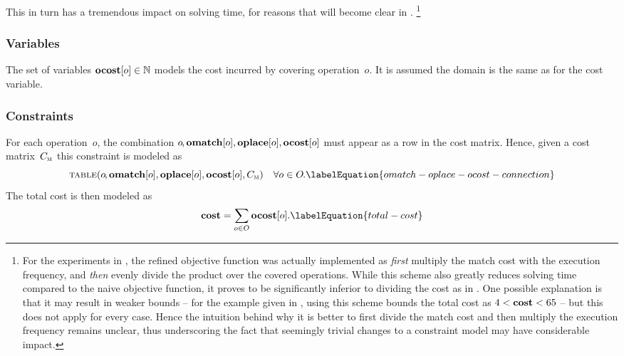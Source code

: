 %
This in turn has a tremendous impact on solving time, for reasons that will
become clear in .\!%
%
\footnote{%
  For the experiments in \cite{HjortBlindellEtAl:2017:CASES}, the refined
  \gls{objective function} was actually implemented as \emph{first} multiply the
  \gls{match} cost with the execution frequency, and \emph{then} evenly divide
  the product over the covered \glspl{operation}.
  While this scheme also greatly reduces solving time compared to the naive
  \gls{objective function}, it proves to be significantly inferior to dividing
  the cost as in .
  One possible explanation is that it may result in weaker bounds -- for the
  example given in , using this scheme bounds the total
  cost as \mbox{$4 < \mVar{cost} < 65$} -- but this does not apply for every
  case.
  Hence the intuition behind why it is better to first divide the \gls{match}
  cost and then multiply the execution frequency remains unclear, thus
  underscoring the fact that seemingly trivial changes to a \gls{constraint
    model} may have considerable impact.%
}


\subsubsection{Variables}

The set of \glspl{variable} \mbox{$\mVar{ocost}[o] \in \mNatNumSet$} models the
cost incurred by covering \gls{operation}~$o$\hspace{-.8pt}.
%
It is assumed the \gls{domain} is the same as for the \gls{cost variable}.


\subsubsection{Constraints}

For each \gls{operation}~$o$\hspace{-.8pt}, the combination
\mbox{$o\hspace{-.8pt}, \mVar{omatch}[o], \mVar{oplace}[o], \mVar{ocost}[o]$}
must appear as a row in the cost matrix.
%
Hence, given a cost matrix~$C_{\textsc{m}}$ this \gls{constraint} is modeled as
%
\begin{equation}
  \mTable(
    o\hspace{-1pt},
    \mVar{omatch}[o],
    \mVar{oplace}[o],
    \mVar{ocost}[o],
    \mCostMatrix
  )
  \mQuantSep
  \forall o \in \mOpSet \hspace{-.8pt}.
  \labelEquation{omatch-oplace-ocost-connection}
\end{equation}
%
The total cost is then modeled as
%
\begin{equation}
  \mVar{cost} = \sum_{o \in \mOpSet} \mVar{ocost}[o].
  \labelEquation{total-cost}
\end{equation}


